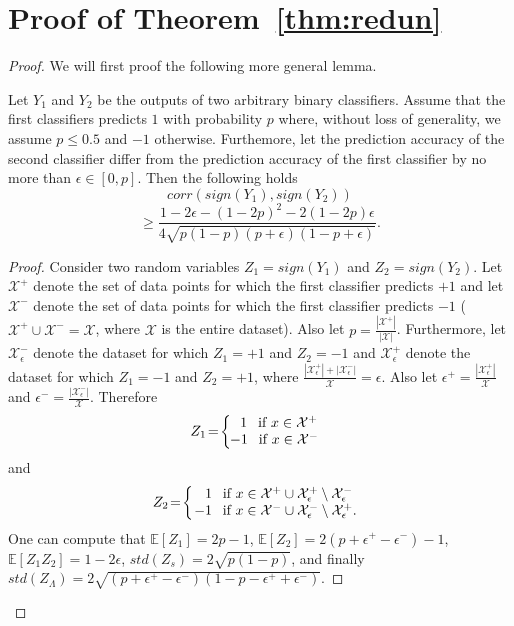 \documentclass[twoside]{article}
\begin{document}
\section{Proof of Theorem~\ref{thm:redun}}
\begin{proof}
We will first proof the following more general lemma.
\begin{lemma}
Let $Y_1$ and $Y_2$ be the outputs of two arbitrary binary classifiers. Assume that the first classifiers predicts $1$ with probability $p$ where, without loss of generality, we assume $p \leq 0.5$ and $-1$ otherwise. Furthemore, let the prediction accuracy of the second classifier differ from the prediction accuracy of the first classifier by no more than $\epsilon \in [0,p]$. Then the following holds
\[corr(sign(Y_1),sign(Y_2))
\]
\[\geq \frac{1 - 2\epsilon - (1 - 2p)^2 - 2(1 - 2p)\epsilon}{4\sqrt{p(1 - p)(p + \epsilon)(1 - p + \epsilon)}}.
\]
\end{lemma}
\begin{proof}
Consider two random variables $Z_1 = sign(Y_1)$ and $Z_2 = sign(Y_2)$. Let $\mathcal{X}^{+}$ denote the set of data points for which the first classifier predicts $+1$ and let $\mathcal{X}^{-}$ denote the set of data points for which the first classifier predicts $-1$ ($\mathcal{X}^{+} \cup \mathcal{X}^{-} = \mathcal{X}$, where $\mathcal{X}$ is the entire dataset). Also let $p = \frac{|\mathcal{X}^{+}|}{|\mathcal{X}|}$. Furthermore, let $\mathcal{X}_{\epsilon}^{-}$ denote the dataset for which $Z_1 = +1$ and $Z_2 = -1$ and $\mathcal{X}_{\epsilon}^{+}$ denote the dataset for which $Z_1 = -1$ and $Z_2 = +1$, where $\frac{|\mathcal{X}_{\epsilon}^{+}| + |\mathcal{X}_{\epsilon}^{-}|}{\mathcal{X}} = \epsilon$. Also let $\epsilon^{+} = \frac{|\mathcal{X}_{\epsilon}^{+}|}{\mathcal{X}}$ and $\epsilon^{-} = \frac{|\mathcal{X}_{\epsilon}^{-}|}{\mathcal{X}}$. Therefore
\[Z_1 \!=\! \left \{
  \begin{tabular}{c}
  $1$ \:\:if $x \in \mathcal{X}^{+}$\\
  \!\!\!\!$-1$ \:\:if $x \in \mathcal{X}^{-}$
  \end{tabular}
\right.
\]
and
\[Z_2 \!=\! \left \{
  \begin{tabular}{c}
  $1$ \:\:if $x \in \mathcal{X}^{+} \cup \mathcal{X}_{\epsilon}^{+}  \setminus \mathcal{X}_{\epsilon}^{-}$\\
  \!\!\!$-1$ \:\:if $x \in \mathcal{X}^{-} \cup \mathcal{X}_{\epsilon}^{-} \setminus \mathcal{X}_{\epsilon}^{+}$.
  \end{tabular}
\right.
\]
One can compute that $\mathbb{E}[Z_1] = 2p-1$, $\mathbb{E}[Z_2] = 2(p + \epsilon^{+} - \epsilon^{-}) - 1$, $\mathbb{E}[Z_1Z_2] = 1 - 2\epsilon$, $std(Z_s) = 2\sqrt{p(1-p)}$, and finally $std(Z_\Lambda) = 2\sqrt{(p + \epsilon^{+} - \epsilon^{-})(1 - p - \epsilon^{+} + \epsilon^{-})}$.

\end{proof}
\end{proof}
\end{document}
